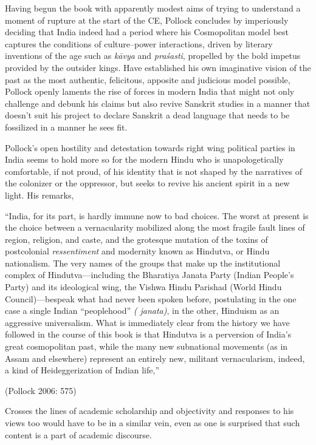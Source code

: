 Having begun the book with apparently modest aims of trying to understand a moment of rupture at the start of the CE, Pollock concludes by imperiously deciding that India indeed had a period where his Cosmopolitan model best captures the conditions of culture–power interactions, driven by literary inventions of the age such as \textit{kāvya} and \textit{praśasti}, propelled by the bold impetus provided by the outsider kings. Have established his own imaginative vision of the past as the most authentic, felicitous, apposite and judicious model possible, Pollock openly laments the rise of forces in modern India that might not only challenge and debunk his claims but also revive Sanskrit studies in a manner that doesn’t suit his project to declare Sanskrit a dead language that needs to be fossilized in a manner he sees fit.

Pollock’s open hostility and detestation towards right wing political parties in India seems to hold more so for the modern Hindu who is unapologetically comfortable, if not proud, of his identity that is not shaped by the narratives of the colonizer or the oppressor, but seeks to revive his ancient spirit in a new light. His remarks,

\begin{myquote}
“India, for its part, is hardly immune now to bad choices. The worst at present is the choice between a vernacularity mobilized along the most fragile fault lines of region, religion, and caste, and the grotesque mutation of the toxins of postcolonial \textit{ressentiment} and modernity known as Hindutva, or Hindu nationalism. The very names of the groups that make up the institutional complex of Hindutva—including the Bharatiya Janata Party (Indian People’s Party) and its ideological wing, the Vishwa Hindu Parishad (World Hindu Council)—bespeak what had never been spoken before, postulating in the one case a single Indian “peoplehood” \textit{( janata)}, in the other, Hinduism as an aggressive universalism. What is immediately clear from the history we have followed in the course of this book is that Hindutva is a perversion of India’s great cosmopolitan past, while the many new subnational movements (as in Assam and elsewhere) represent an entirely new, militant vernacularism, indeed, a kind of Heideggerization of Indian life,”
\end{myquote}

\hfill (Pollock 2006: 575)

Crosses the lines of academic scholarship and objectivity and responses to his views too would have to be in a similar vein, even as one is surprised that such content is a part of academic discourse.

